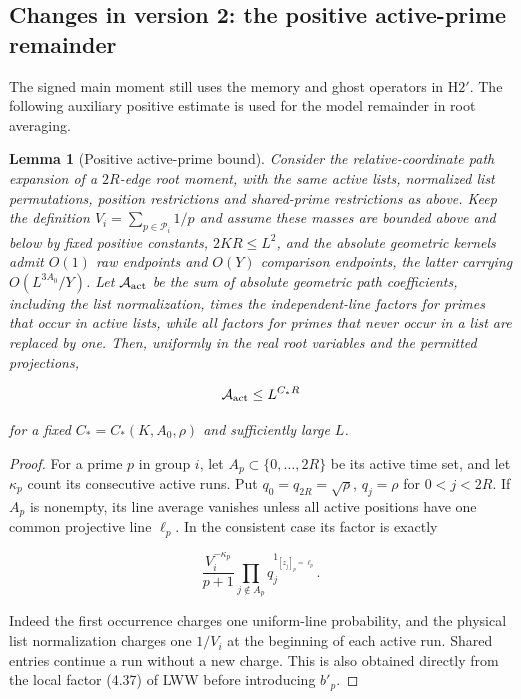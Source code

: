 \documentclass[11pt]{article}
\newtheorem{lemma}[theorem]{Lemma}
\theoremstyle{definition}
\theoremstyle{remark}
\numberwithin{equation}{section}
\begin{document}
\subsection{Changes in version 2: the positive active-prime remainder}\label{subsec:positive-tail}
The signed main moment still uses the memory and ghost operators
in $\mathrm H2'$. The following auxiliary positive estimate is
used for the model remainder in root averaging.
\begin{lemma}[Positive active-prime bound]\label{lem:positive}
Consider the relative-coordinate path expansion of a $2R$-edge root moment, with the same active lists, normalized list permutations, position restrictions and shared-prime restrictions as above. Keep the definition $V_i=\sum_{p\in\mathcal P_i}1/p$ and assume these masses are bounded above and below by fixed positive constants, $2KR\le L^2$, and the absolute geometric kernels admit $O(1)$ raw endpoints and $O(Y)$ comparison endpoints, the latter carrying $O(L^{3A_0}/Y)$. Let $\mathcal A_{\rm act}$ be the sum of absolute geometric path coefficients, including the list normalization, times the independent-line factors for primes that occur in active lists, while all factors for primes that never occur in a list are replaced by one. Then, uniformly in the real root variables and the permitted projections,


\begin{equation}\label{v2:9-1}
\mathcal A_{\rm act}\le L^{C_*R}
\end{equation}


for a fixed $C_*=C_*(K,A_0,\rho)$ and sufficiently large $L$.

\end{lemma}\begin{proof} For a prime $p$ in group $i$, let $A_p\subset\{0,\ldots,2R\}$ be its active time set, and let $\kappa_p$ count its consecutive active runs. Put $q_0=q_{2R}=\sqrt\rho$, $q_j=\rho$ for $0<j<2R$. If $A_p$ is nonempty, its line average vanishes unless all active positions have one common projective line $\ell_p$. In the consistent case its factor is exactly


\begin{equation}\label{v2:9-2}
\frac{V_i^{-\kappa_p}}{p+1}
\prod_{j\notin A_p}q_j^{1_{[z_j]_p=\ell_p}}.
\end{equation}


Indeed the first occurrence charges one uniform-line probability, and the physical list normalization charges one $1/V_i$ at the beginning of each active run. Shared entries continue a run without a new charge. This is also obtained directly from the local factor (4.37) of LWW before introducing $b'_p$.


\end{proof}
\end{document}
